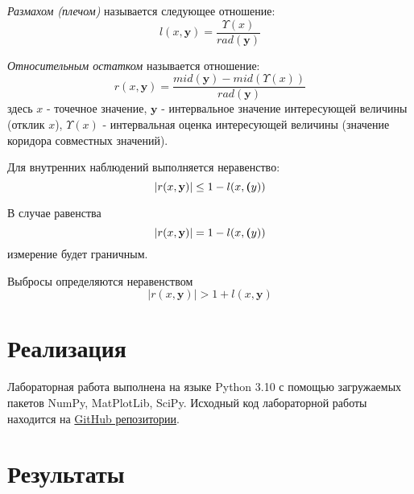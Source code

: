 \documentclass[12pt,a4paper]{article}
\begin{document}
                \textsl{Размахом (плечом)} называется следующее отношение:
                \begin{equation}
                    l(x, \textbf{y}) = \frac{\Upsilon(x)}{rad(\textbf{y})}
                \end{equation}
            
                \textsl{Относительным остатком} называется отношение:
                \begin{equation}
                    r(x, \textbf{y}) = \frac{mid(\textbf{y}) - mid(\Upsilon(x))}{rad(\textbf{y})}
                \end{equation}
                здесь $ x $ - точечное значение, $ \textbf{y} $ - интервальное значение интересующей величины (отклик $ x $),
                $ \Upsilon(x) $ - интервальная оценка интересующей величины (значение коридора совместных значений).
            
                Для внутренних наблюдений выполняется неравенство:
                \begin{equation}
                    |r(x, \textbf{y})| \leq 1 - l(x, \textbf(y))
                \end{equation}
                
                В случае равенства 
                \begin{equation}
                    |r(x, \textbf{y})| = 1 - l(x, \textbf(y))
                \end{equation}
                измерение будет граничным.
            
                Выбросы определяются неравенством
                \begin{equation}
                    |r(x, \textbf{y})| > 1 + l(x, \textbf{y})
                \end{equation}
                
	\newpage
	
	\section{Реализация}
		Лабораторная работа выполнена на языке Python 3.10 с помощью загружаемых пакетов NumPy, MatPlotLib, SciPy. Исходный код лабораторной работы находится на \href{https://github.com/Drusiand/SPbSTU_Interval_Analysis.git}{GitHub репозитории}.
	\newpage
	
	\section{Результаты}  
\end{document}
